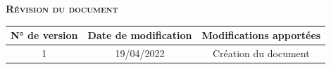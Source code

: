 \documentclass[oneside,12pt]{scrartcl}
\begin{document}

\thispagestyle{empty} %

\newpage

\begin{center}
\textsc{\Large \textbf{Révision du document}}
\end{center}
\vspace{2cm}
\begin{center}
\begin{tabular}{|c|c|c|}
    \hline
  N° de version & Date de modification & Modifications apportées  \\
    \hline
    1 & 19/04/2022 & Création du document\\
    \hline
\end{tabular}
\end{center}


\newpage
{} %
{
\renewcommand*\contentsname{Sommaire}
\tableofcontents
}

\clearpage






\end{document}
